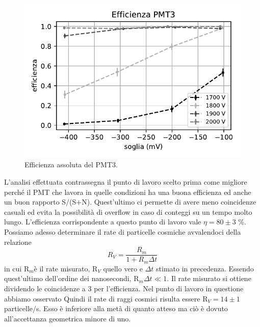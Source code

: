 \documentclass[a4paper]{article}
\begin{document}
\begin{figure}[h]
\centering
\includegraphics[width=8 cm]{efficienza}
\caption{\label{eff}Efficienza assoluta del PMT3.}
\end{figure}

L'analisi effettuata contrassegna il punto di lavoro scelto prima come migliore perché il PMT che lavora in quelle condizioni ha una buona efficienza ed anche un buon rapporto S$/$(S$+$N). Quest'ultimo ci permette di avere meno coincidenze casuali ed evita la possibilità di overflow in caso di conteggi su un tempo molto lungo. L'efficienza corrispondente a questo punto di lavoro vale $\eta=80\pm3$\! \%. Possiamo adesso determinare il rate di particelle cosmiche avvalendoci della relazione 
$$ R_V=\frac{R_m}{1+R_m\Delta t} $$
in cui R$_m$è il rate misurato, R$_V$ quello vero e $\Delta t$ stimato in precedenza. Essendo quest'ultimo dell'ordine dei nanosecondi, R$_m\Delta t \ll 1$. Il rate misurato si ottiene dividendo le coincidenze a 3 per l'efficienza. Nel punto di lavoro in questione abbiamo osservato Quindi il rate di raggi cosmici risulta essere R$_V=14\pm1$\! particelle$/$s. Esso è inferiore alla metà di quanto atteso ma ciò è dovuto all'accettanza geometrica minore di uno.
\end{document}
